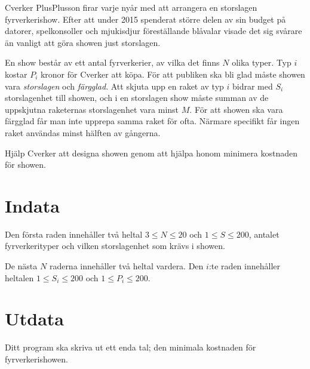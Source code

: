 Cverker PlusPlusson firar varje nyår med att arrangera en storslagen fyrverkerishow. Efter att under 2015 spenderat större delen av sin budget på datorer, spelkonsoller och mjukisdjur föreställande blåvalar visade det sig svårare än vanligt att göra showen just storslagen.

En show består av ett antal fyrverkerier, av vilka det finns $N$ olika typer. Typ $i$ kostar $P_i$ kronor för Cverker att köpa. För att publiken ska bli glad måste showen vara \emph{storslagen} och \emph{färgglad}. Att skjuta upp en raket av typ $i$ bidrar med $S_i$ storslagenhet till showen, och i en storslagen show måste summan av de uppskjutna raketernas storslagenhet vara minst $M$. För att showen ska vara färgglad får man inte upprepa samma raket för ofta. Närmare specifikt får ingen raket användas minst hälften av gångerna.

Hjälp Cverker att designa showen genom att hjälpa honom minimera kostnaden för showen.

\section*{Indata}
Den första raden innehåller två heltal $3 \le N \le 20$ och $1 \le S \le 200$, antalet fyrverkerityper och vilken storslagenhet som krävs i showen.

De nästa $N$ raderna innehåller två heltal vardera. Den $i$:te raden innehåller heltalen $1 \le S_i \le 200$ och $1 \le P_i \le 200$.

\section*{Utdata}
Ditt program ska skriva ut ett enda tal; den minimala kostnaden för fyrverkerishowen.
